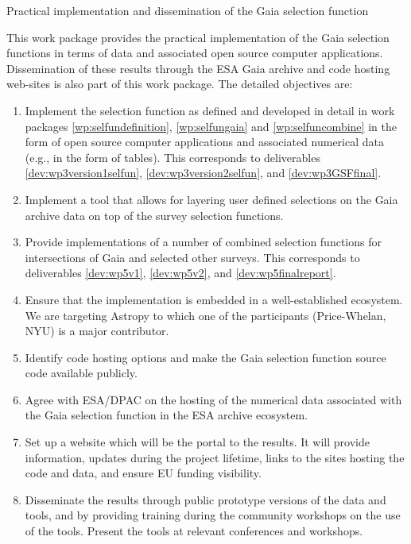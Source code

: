 \begin{workpackage}{Practical implementation and dissemination of the Gaia selection function}
  \label{wp:selfunimplementation}
  \wpend{\duration} %
 
  \makewptable %

  \begin{wpobjectives}
    This work package provides the practical implementation of the Gaia selection functions in terms of data and associated open source computer applications. Dissemination of these results through the ESA Gaia archive and code hosting web-sites is also part of this work package. The detailed objectives are:
    \begin{enumerate}
      \item Implement the selection function as defined and developed in detail in work packages \ref{wp:selfundefinition}, \ref{wp:selfungaia} and \ref{wp:selfuncombine} in the form of open source computer applications and associated numerical data (e.g., in the form of tables). This corresponds to deliverables \ref{dev:wp3version1selfun}, \ref{dev:wp3version2selfun}, and \ref{dev:wp3GSFfinal}.
      \item Implement a tool that allows for layering user defined selections on the Gaia archive data on top of the survey selection functions.
      \item Provide implementations of a number of combined selection functions for intersections of Gaia and selected other surveys. This corresponds to deliverables \ref{dev:wp5v1}, \ref{dev:wp5v2}, and \ref{dev:wp5finalreport}.
      \item Ensure that the implementation is embedded in a well-established ecosystem. We are targeting Astropy to which one of the participants (Price-Whelan, NYU) is a major contributor.
      \item Identify code hosting options and make the Gaia selection function source code available publicly.
      \item Agree with ESA/DPAC on the hosting of the numerical data associated with the Gaia selection function in the ESA archive ecosystem.
      \item Set up a website which will be the portal to the {\acro} results. It will provide information, updates during the project lifetime, links to the sites hosting the code and data, and ensure EU funding visibility.
      \item Disseminate the results through public prototype versions of the {\acro} data and tools, and by providing training during the community workshops on the use of the tools. Present the {\acro} tools at relevant conferences and workshops.
    \end{enumerate}
  \end{wpobjectives}


\end{workpackage}
